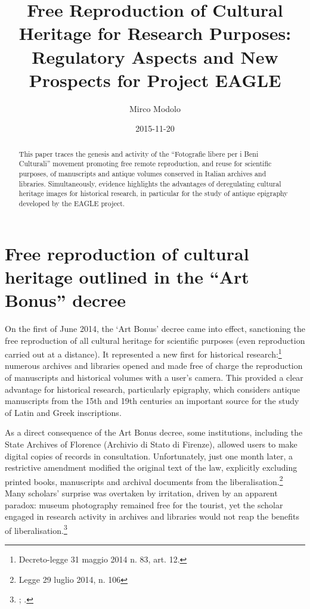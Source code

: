 \documentclass[amsthm,ebook]{saparticle}
\title{Free Reproduction of Cultural Heritage for Research Purposes:
Regulatory Aspects and New Prospects for Project EAGLE}
\author[free]{Mirco Modolo\corref{first}}
\date{2015-11-20}
\begin{document}
\maketitle
\begin{abstract}
This paper traces the genesis and activity of the ``Fotografie libere per i Beni Culturali'' movement promoting free
remote reproduction, and reuse for scientific purposes, of manuscripts and antique volumes conserved in Italian
archives and libraries. Simultaneously, evidence highlights the advantages of deregulating cultural heritage images for
historical research, in particular for the study of antique epigraphy developed by the EAGLE project.
\end{abstract}

\section{Free reproduction of cultural heritage outlined in the ``Art Bonus'' decree}


On the first of June 2014, the `Art Bonus' decree came into effect, sanctioning the free reproduction of all cultural
heritage for scientific purposes (even reproduction carried out at a distance). It represented a new first for
historical research:\footnote{Decreto-legge 31 maggio 2014 n. 83, art. 12.} numerous archives and libraries opened
and made free of charge the reproduction of manuscripts and historical volumes with a user’s camera. This provided a
clear advantage for historical research, particularly epigraphy, which considers antique manuscripts from the 15th and
19th centuries an important source for the study of Latin and Greek inscriptions. 

As a direct consequence of the Art Bonus decree, some institutions, including the State Archives of Florence (Archivio
di Stato di Firenze), allowed users to make digital copies of records in consultation. Unfortunately, just one month
later, a restrictive amendment modified the original text of the law, explicitly excluding printed books, manuscripts
and archival documents from the liberalisation.\footnote{Legge 29 luglio 2014, n. 106} Many scholars’ surprise was
overtaken by irritation, driven by an apparent paradox: museum photography remained free for the tourist, yet the
scholar engaged in research activity in archives and libraries would not reap the benefits of
liberalisation.\footnote{\citet{modolo_il_2014}; \citet{brugnoli_ancora_2014}. }
\end{document}
